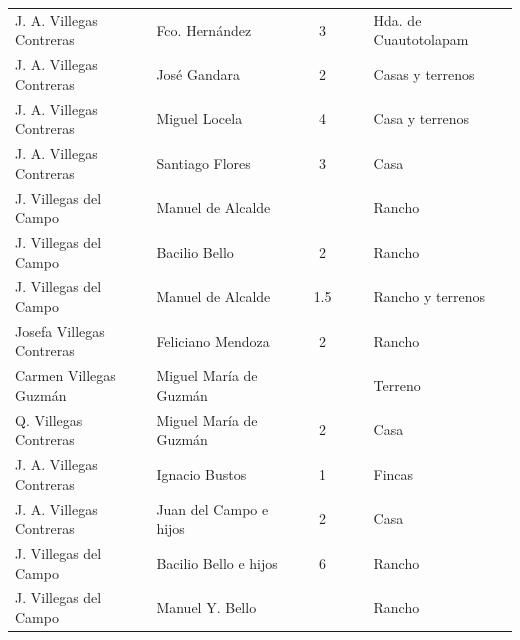 \documentclass[14pt,twoside,final]{extbook} %
\begin{document}
{\begin{longtable}[c]{@{}p{2.5cm}lrSrrl@{}}
J. A. Villegas Contreras & Fco. Hernández &  & 3 &  &  & Hda. de Cuautotolapam \\
J. A. Villegas Contreras & José Gandara &  & 2 &  &  & Casas y terrenos \\
J. A. Villegas Contreras & Miguel Locela &  & 4 &  &  & Casa y terrenos \\
J. A. Villegas Contreras & Santiago Flores &  & 3 &  &  & Casa \\
J. Villegas del Campo & Manuel de Alcalde &  & &  &  & Rancho \\
J. Villegas del Campo & Bacilio Bello &  & 2 & {} & {} & Rancho \\
J. Villegas del Campo & Manuel de Alcalde &  & 1.5 &  &  & Rancho y terrenos \\
Josefa Villegas Contreras & Feliciano Mendoza &  & 2 & {} & {} & Rancho \\
Carmen Villegas Guzmán & Miguel María de Guzmán &  & {} & {} & {} & Terreno \\
Q. Villegas Contreras & Miguel María de Guzmán &  & 2 & {} & {} & Casa \\
J. A. Villegas Contreras & Ignacio Bustos &  & 1 &  &  & Fincas \\
J. A. Villegas Contreras & Juan del Campo e hijos &  & 2 &  &  & Casa \\
J. Villegas del Campo & Bacilio Bello e hijos &  & 6 & {} & {} & Rancho \\
J. Villegas del Campo & Manuel Y. Bello &  & {} & {} & {} & Rancho \\

\end{longtable}}
\end{document}

